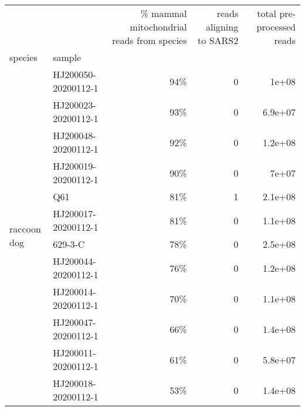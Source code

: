 \begin{tabular}{llrrr}
\toprule
                  &                     & \% mammal mitochondrial reads from species &  reads aligning to SARS2 & total pre-processed reads \\
species & sample &                                           &                          &                           \\
\midrule
\multirow{28}{*}{raccoon dog} & HJ200050-20200112-1 &                                       94\% &                        0 &                     1e+08 \\
                  & HJ200023-20200112-1 &                                       93\% &                        0 &                   6.9e+07 \\
                  & HJ200048-20200112-1 &                                       92\% &                        0 &                   1.2e+08 \\
                  & HJ200019-20200112-1 &                                       90\% &                        0 &                     7e+07 \\
                  & Q61 &                                       81\% &                        1 &                   2.1e+08 \\
                  & HJ200017-20200112-1 &                                       81\% &                        0 &                   1.1e+08 \\
                  & 629-3-C &                                       78\% &                        0 &                   2.5e+08 \\
                  & HJ200044-20200112-1 &                                       76\% &                        0 &                   1.2e+08 \\
                  & HJ200014-20200112-1 &                                       70\% &                        0 &                   1.1e+08 \\
                  & HJ200047-20200112-1 &                                       66\% &                        0 &                   1.4e+08 \\
                  & HJ200011-20200112-1 &                                       61\% &                        0 &                   5.8e+07 \\
                  & HJ200018-20200112-1 &                                       53\% &                        0 &                   1.4e+08 \\

\end{tabular}
